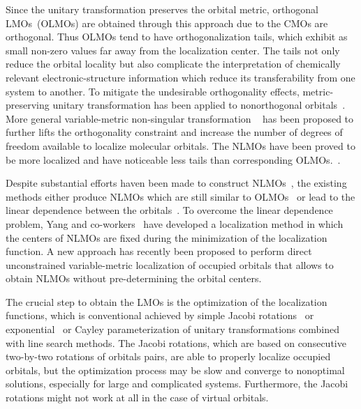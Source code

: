 \documentclass[aps,prl,reprint,amsmath,amssymb]{revtex4-1}
\begin{document}
Since the unitary transformation preserves the orbital metric, orthogonal LMOs~(OLMOs) are obtained through this approach due to the CMOs are orthogonal.
Thus OLMOs tend to have orthogonalization tails, which exhibit as small non-zero values far away from the localization center.
The tails not only reduce the orbital locality but also complicate the interpretation of chemically relevant electronic-structure information which reduce its transferability from one system to another.
To mitigate the undesirable orthogonality effects, metric-preserving unitary transformation has been applied to nonorthogonal orbitals~\cite{hoyvik2017generalising}.
More general variable-metric non-singular transformation ~\cite{anderson1968self, diner1968fully, magnasco1974localized, payne1977hartree, mehler1977self, feng2004An_efficient, cui2010efficient} has been proposed to further lifts the orthogonality constraint and increase the number of degrees of freedom available to localize molecular orbitals.
The NLMOs have been proved to be more localized and have noticeable less tails than corresponding OLMOs.~\cite{feng2004An_efficient, liu2000nonorthogonal}.

Despite substantial efforts haven been made to construct NLMOs~\cite{feng2004An_efficient, liu2000nonorthogonal, peng2013effective, hoyvik2017generalising}, the existing methods either produce NLMOs which are still similar to OLMOs~\cite{sundberg1979variationally} or lead to the linear dependence between the orbitals~\cite{feng2004An_efficient}.
To overcome the linear dependence problem, Yang and co-workers~\cite{feng2004An_efficient, cui2010efficient} have developed a localization method in which the centers of NLMOs are fixed during the minimization of the localization function. 
A new approach has recently been proposed to perform direct unconstrained variable-metric localization of occupied orbitals that allows to obtain NLMOs without pre-determining the orbital centers.~\cite{luo2020direct} 

The crucial step to obtain the LMOs is the optimization of the localization functions, which is conventional achieved by simple Jacobi rotations~\cite{edmiston1963localized, barr1975improved} or exponential~\cite{berghold2000general} or Cayley parameterization of unitary transformations combined with line search methods.
The Jacobi rotations, which are based on consecutive two-by-two rotations of orbitals pairs, are able to properly localize occupied orbitals, but the optimization process may be slow and converge to nonoptimal solutions, especially for large and complicated systems.
Furthermore, the Jacobi rotations might not work at all in the case of virtual orbitals.
\end{document}
